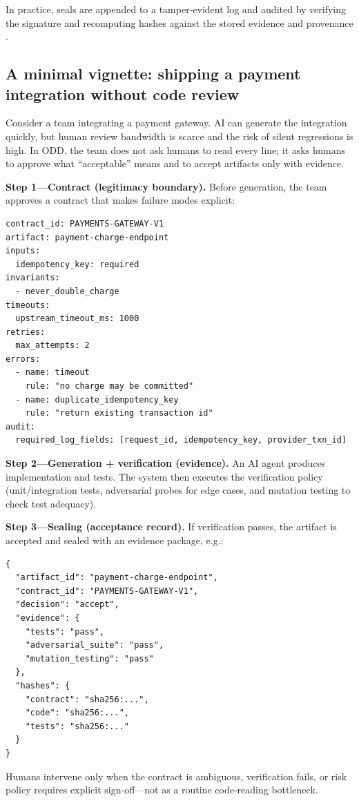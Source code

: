 \documentclass[conference]{IEEEtran}
\begin{document}
In practice, seals are appended to a tamper-evident log and audited by verifying the signature and recomputing hashes against the stored evidence and provenance \cite{torresarias2019intoto, openssf2023slsa, newman2022sigstore}.

\subsection{A minimal vignette: shipping a payment integration without code review}
Consider a team integrating a payment gateway. AI can generate the integration quickly, but human review bandwidth is scarce and the risk of silent regressions is high. In ODD, the team does not ask humans to read every line; it asks humans to approve what ``acceptable'' means and to accept artifacts only with evidence.

\textbf{Step 1---Contract (legitimacy boundary).} Before generation, the team approves a contract that makes failure modes explicit:
\begin{lstlisting}
contract_id: PAYMENTS-GATEWAY-V1
artifact: payment-charge-endpoint
inputs:
  idempotency_key: required
invariants:
  - never_double_charge
timeouts:
  upstream_timeout_ms: 1000
retries:
  max_attempts: 2
errors:
  - name: timeout
    rule: "no charge may be committed"
  - name: duplicate_idempotency_key
    rule: "return existing transaction id"
audit:
  required_log_fields: [request_id, idempotency_key, provider_txn_id]
\end{lstlisting}

\textbf{Step 2---Generation + verification (evidence).} An AI agent produces implementation and tests. The system then executes the verification policy (unit/integration tests, adversarial probes for edge cases, and mutation testing to check test adequacy).

\textbf{Step 3---Sealing (acceptance record).} If verification passes, the artifact is accepted and sealed with an evidence package, e.g.:
\begin{lstlisting}
{
  "artifact_id": "payment-charge-endpoint",
  "contract_id": "PAYMENTS-GATEWAY-V1",
  "decision": "accept",
  "evidence": {
    "tests": "pass",
    "adversarial_suite": "pass",
    "mutation_testing": "pass"
  },
  "hashes": {
    "contract": "sha256:...",
    "code": "sha256:...",
    "tests": "sha256:..."
  }
}
\end{lstlisting}

Humans intervene only when the contract is ambiguous, verification fails, or risk policy requires explicit sign-off---not as a routine code-reading bottleneck.
\end{document}
